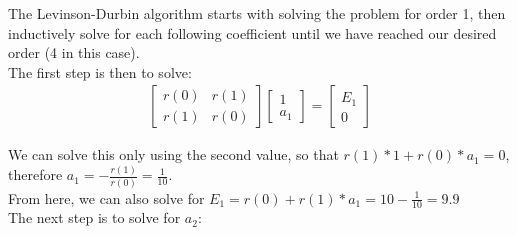 \documentclass[12pt]{article}
\begin{document}
The Levinson-Durbin algorithm starts with solving the problem for order 1, then inductively solve for each following coefficient until we have reached our desired order (4 in this case).\\

The first step is then to solve:
\begin{align*}
\begin{bmatrix}
r(0) & r(1)\\
r(1) & r(0)
\end{bmatrix}
\begin{bmatrix}
1\\
a_1
\end{bmatrix}
=
\begin{bmatrix}
E_1\\
0
\end{bmatrix}
\end{align*}

We can solve this only using the second value, so that $r(1)*1 + r(0)*a_1 = 0$, therefore $a_1 = -\frac{r(1)}{r(0)} = \frac{1}{10}$.\\

From here, we can also solve for $E_1 = r(0) + r(1) * a_1 = 10 - \frac{1}{10} = 9.9$\\

The next step is to solve for $a_2$:
\end{document}
